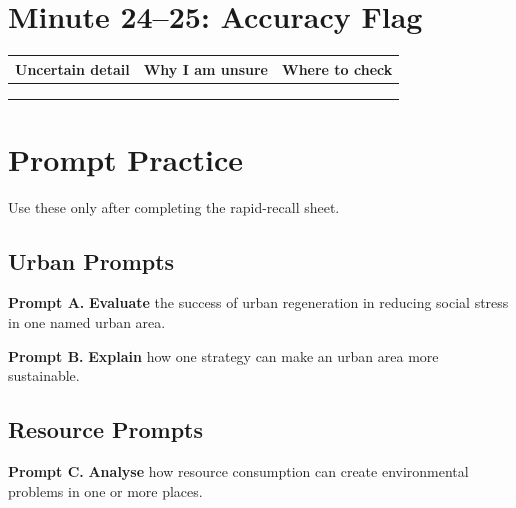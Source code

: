 \documentclass[11pt,a4paper]{article}
\newcommand{\exam}[1]{\textcolor{AccentTeal}{\textbf{#1}}}
\begin{document}
\section{Minute 24--25: Accuracy Flag}

\begin{tabularx}{\textwidth}{L{0.24\textwidth}Y Y}
\toprule
\textbf{Uncertain detail} & \textbf{Why I am unsure} & \textbf{Where to check} \\
\midrule
 & & \\
 & & \\
 & & \\
\bottomrule
\end{tabularx}

\newpage

\section{Prompt Practice}

Use these only after completing the rapid-recall sheet.

\subsection{Urban Prompts}

\noindent\colorbox{SoftTint}{%
\begin{minipage}{0.965\textwidth}
\sffamily
\textbf{\textcolor{HeadingBlue}{Prompt A.}}
\exam{Evaluate} the success of urban regeneration in reducing social stress in
one named urban area.
\end{minipage}
}

\vspace{0.45em}

\noindent\colorbox{SoftBlue}{%
\begin{minipage}{0.965\textwidth}
\sffamily
\textbf{\textcolor{HeadingBlue}{Prompt B.}}
\exam{Explain} how one strategy can make an urban area more sustainable.
\end{minipage}
}

\subsection{Resource Prompts}

\noindent\colorbox{SoftTint}{%
\begin{minipage}{0.965\textwidth}
\sffamily
\textbf{\textcolor{HeadingBlue}{Prompt C.}}
\exam{Analyse} how resource consumption can create environmental problems in
one or more places.
\end{minipage}
}
\end{document}
